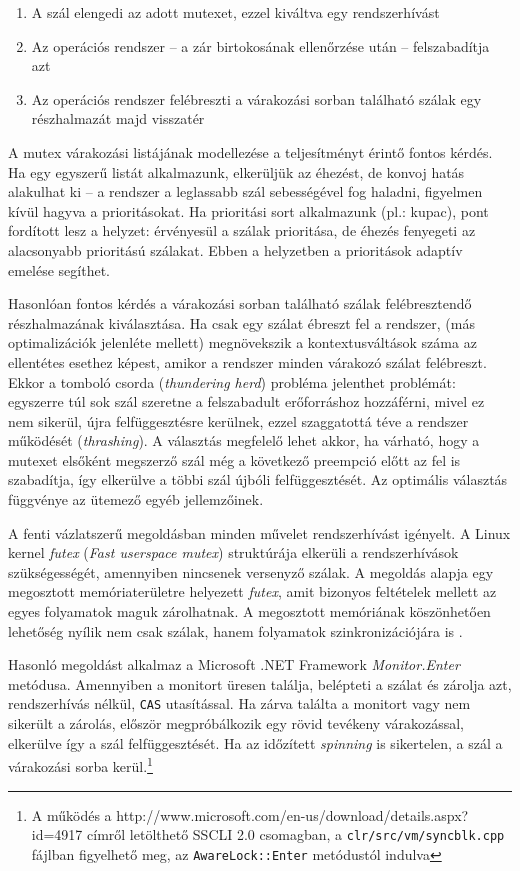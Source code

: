     \begin{enumerate}
        \item A szál elengedi az adott mutexet, ezzel kiváltva egy rendszerhívást
        \item Az operációs rendszer -- a zár birtokosának ellenőrzése után -- felszabadítja azt
        \item Az operációs rendszer felébreszti a várakozási sorban található szálak egy részhalmazát majd visszatér
    \end{enumerate}
%
    A mutex várakozási listájának modellezése a teljesítményt érintő fontos kérdés. Ha egy egyszerű listát alkalmazunk, elkerüljük az éhezést, de konvoj hatás alakulhat ki -- a rendszer a leglassabb szál sebességével fog haladni, figyelmen kívül hagyva a prioritásokat. Ha prioritási sort alkalmazunk (pl.: kupac), pont fordított lesz a helyzet: érvényesül a szálak prioritása, de éhezés fenyegeti az alacsonyabb prioritású szálakat. Ebben a helyzetben a prioritások adaptív emelése segíthet.
    
    Hasonlóan fontos kérdés a várakozási sorban található szálak felébresztendő részhalmazának kiválasztása. Ha csak egy szálat ébreszt fel a rendszer, (más optimalizációk jelenléte mellett) megnövekszik a kontextusváltások száma az ellentétes esethez képest, amikor a rendszer minden várakozó szálat felébreszt. Ekkor a tomboló csorda (\emph{thundering herd}) probléma jelenthet problémát: egyszerre túl sok szál szeretne a felszabadult erőforráshoz hozzáférni, mivel ez nem sikerül, újra felfüggesztésre kerülnek, ezzel szaggatottá téve a rendszer működését (\emph{thrashing}). A választás megfelelő lehet akkor, ha várható, hogy a mutexet elsőként megszerző szál még a következő preempció előtt az fel is szabadítja, így elkerülve a többi szál újbóli felfüggesztését. Az optimális választás függvénye az ütemező egyéb jellemzőinek.
    
    A fenti vázlatszerű megoldásban minden művelet rendszerhívást igényelt. A Linux kernel \emph{futex} (\emph{Fast userspace mutex}) struktúrája elkerüli a rendszerhívások szükségességét, amennyiben nincsenek versenyző szálak. A megoldás alapja egy megosztott memóriaterületre helyezett \emph{futex}, amit bizonyos feltételek mellett az egyes folyamatok maguk zárolhatnak. A megosztott memóriának köszönhetően lehetőség nyílik nem csak szálak, hanem folyamatok szinkronizációjára is \cite{Futex}.
    
    Hasonló megoldást alkalmaz a Microsoft .NET Framework \emph{Monitor.Enter} metódusa. Amennyiben a monitort üresen találja, belépteti a szálat és zárolja azt, rendszerhívás nélkül, \texttt{CAS} utasítással. Ha zárva találta a monitort vagy nem sikerült a zárolás, először megpróbálkozik egy rövid tevékeny várakozással, elkerülve így a szál felfüggesztését. Ha az időzített \emph{spinning} is sikertelen, a szál a várakozási sorba kerül.\footnote{A működés a http://www.microsoft.com/en-us/download/details.aspx?id=4917 címről letölthető SSCLI 2.0 csomagban, a \texttt{clr/src/vm/syncblk.cpp} fájlban figyelhető meg, az \texttt{AwareLock::Enter} metódustól indulva}
    
